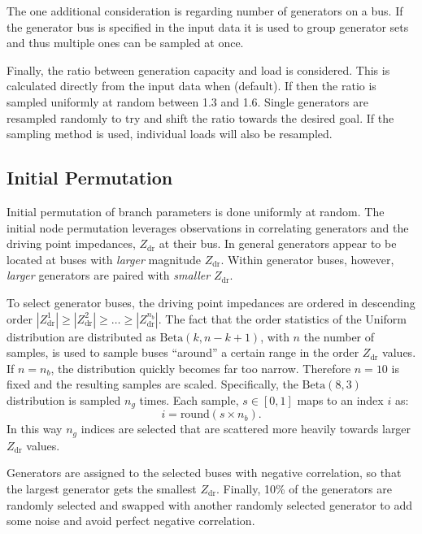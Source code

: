\documentclass[12pt]{article}
\newcommand{\code}[1]{{\relsize{-0.5}{\tt{{#1}}}}}  %
\newcommand{\codeq}[1]{\code{\textquotesingle{}#1\textquotesingle}}  %
\numberwithin{equation}{section}
\numberwithin{table}{section}
\numberwithin{figure}{section}
\begin{document}
The one additional consideration is regarding number of generators on a bus.
If the generator bus is specified in the input data it is used to group generator sets and thus multiple ones can be sampled at once.

Finally, the ratio between generation capacity and load is considered. 
This is calculated directly from the input data when \code{usegen2load=1} (default).
If \code{usegen2load=0} then the ratio is sampled uniformly at random between 1.3 and 1.6.
Single generators are resampled randomly to try and shift the ratio towards the desired goal. 
If the \codeq{direct} sampling method is used, individual loads will also be resampled.

\subsection{Initial Permutation} \label{sec:vm_init}
Initial permutation of branch parameters is done uniformly at random.
The initial node permutation leverages observations in \cite{schweitzer2016GOTF} correlating generators and the driving point impedances, $Z_{\text{dr}}$ at their bus.
In general generators appear to be located at buses with \emph{larger} magnitude $Z_{\text{dr}}$.
Within generator buses, however, \emph{larger} generators are paired with \emph{smaller} $Z_{\text{dr}}$.

To select generator buses, the driving point impedances are ordered in descending order $|Z_{\text{dr}}^1| \geq |Z_{\text{dr}}^2| \geq \ldots \geq |Z_{\text{dr}}^{n_b}|$.
The fact that the order statistics of the Uniform distribution are distributed as $\text{Beta}(k, n-k + 1)$, with $n$ the number of samples, is used to sample buses ``around'' a certain range in the order $Z_{\text{dr}}$ values.
If $n=n_b$, the distribution quickly becomes far too narrow. 
Therefore $n=10$ is fixed and the resulting samples are scaled.
Specifically, the $\text{Beta}(8,3)$ distribution is sampled $n_g$ times.
Each sample, $s\in[0,1]$ maps to an index $i$ as:
\begin{equation}
	i = \text{round}(s\times n_b).
\end{equation}
In this way $n_g$ indices are selected that are scattered more heavily towards larger $Z_{\text{dr}}$ values.

Generators are assigned to the selected buses with negative correlation, so that  the largest generator gets the smallest $Z_{\text{dr}}$. 
Finally, 10\% of the generators are randomly selected and swapped with another randomly selected generator to add some noise and avoid perfect negative correlation.
\end{document}
